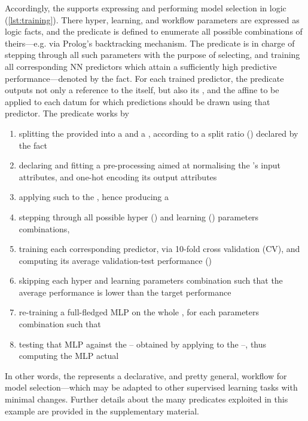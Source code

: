 \documentclass[
]{ceurart}
\begin{document}
Accordingly, the \mllib{} supports expressing and performing model selection in logic (\cref{lst:training}).
%
{}
%
There hyper, learning, and workflow parameters are expressed as logic facts, and the  predicate is defined to enumerate all possible combinations of theirs---e.g. via Prolog's backtracking mechanism.
%
The  predicate is in charge of stepping through all such parameters with the purpose of selecting, and training all corresponding NN predictors which attain a sufficiently high predictive performance---denoted by the  fact.
%
For each trained predictor, the predicate outputs not only a reference to the  itself, but also its , and the affine  to be applied to each datum for which predictions should be drawn using that predictor.
%
The predicate  works by
%
\begin{enumerate}
    \item splitting the provided  into a  and a , according to a split ratio () declared by the  fact
    \item declaring and fitting a pre-processing  aimed at normalising the 's input attributes, and one-hot encoding its output attributes
    \item applying such  to the , hence producing a 
    \item stepping through all possible hyper () and learning () parameters combinations,
    \item training each corresponding predictor, via 10-fold cross validation (CV), and computing its average validation-test performance ()
    \item skipping each hyper and learning parameters combination such that the average performance  is lower than the target performance 
    \item re-training a full-fledged MLP on the whole , for each parameters combination such that 
    \item testing that MLP against the  -- obtained by applying  to the  --, thus computing the MLP actual 
\end{enumerate}
%
In other words, the  represents a declarative, and pretty general, workflow for model selection---which may be adapted to other supervised learning tasks with minimal changes.
%
Further details about the many predicates exploited in this example are provided in the supplementary material.
\end{document}
